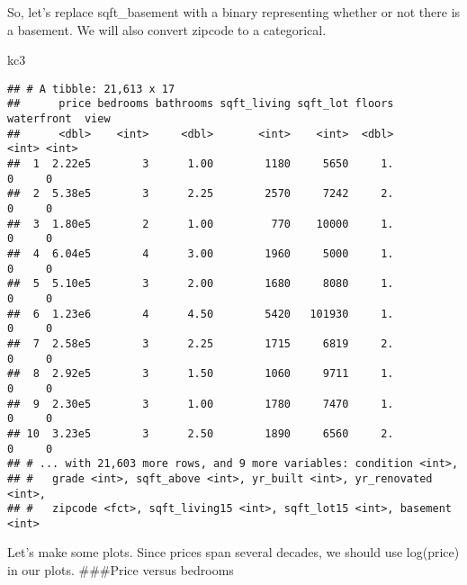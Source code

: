 \documentclass[]{article}
\newenvironment{Shaded}{\begin{snugshade}}{\end{snugshade}}
\newcommand{\KeywordTok}[1]{\textcolor[rgb]{0.13,0.29,0.53}{\textbf{#1}}}
\newcommand{\DecValTok}[1]{\textcolor[rgb]{0.00,0.00,0.81}{#1}}
\newcommand{\StringTok}[1]{\textcolor[rgb]{0.31,0.60,0.02}{#1}}
\newcommand{\OperatorTok}[1]{\textcolor[rgb]{0.81,0.36,0.00}{\textbf{#1}}}
\newcommand{\NormalTok}[1]{#1}
\begin{document}
So, let's replace sqft\_basement with a binary representing whether or
not there is a basement. We will also convert zipcode to a categorical.

\begin{Shaded}
\end{Shaded}

\begin{Shaded}
\begin{Highlighting}[]
\NormalTok{kc3}
\end{Highlighting}
\end{Shaded}

\begin{verbatim}
## # A tibble: 21,613 x 17
##      price bedrooms bathrooms sqft_living sqft_lot floors waterfront  view
##      <dbl>    <int>     <dbl>       <int>    <int>  <dbl>      <int> <int>
##  1  2.22e5        3      1.00        1180     5650     1.          0     0
##  2  5.38e5        3      2.25        2570     7242     2.          0     0
##  3  1.80e5        2      1.00         770    10000     1.          0     0
##  4  6.04e5        4      3.00        1960     5000     1.          0     0
##  5  5.10e5        3      2.00        1680     8080     1.          0     0
##  6  1.23e6        4      4.50        5420   101930     1.          0     0
##  7  2.58e5        3      2.25        1715     6819     2.          0     0
##  8  2.92e5        3      1.50        1060     9711     1.          0     0
##  9  2.30e5        3      1.00        1780     7470     1.          0     0
## 10  3.23e5        3      2.50        1890     6560     2.          0     0
## # ... with 21,603 more rows, and 9 more variables: condition <int>,
## #   grade <int>, sqft_above <int>, yr_built <int>, yr_renovated <int>,
## #   zipcode <fct>, sqft_living15 <int>, sqft_lot15 <int>, basement <int>
\end{verbatim}

Let's make some plots. Since prices span several decades, we should use
log(price) in our plots. \#\#\#Price versus bedrooms
\end{document}
